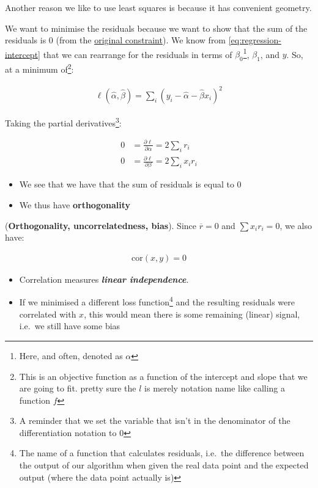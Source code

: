 \documentclass[
]{report}
\providecommand{\tightlist}{%
  \setlength{\itemsep}{0pt}\setlength{\parskip}{0pt}}
\theoremstyle{definition}
\theoremstyle{definition}
\theoremstyle{definition}
\theoremstyle{definition}
\theoremstyle{remark}
\begin{document}
Another reason we like to use least squares is because it has convenient
geometry.

We want to minimise the residuals because we want to show that the sum of the
residuals is 0 (from the \protect\hyperlink{og-constraint}{original constraint}). We know from
\eqref{eq:regression-intercept} that we can rearrange for the residuals in terms
of \(\beta_{0}\)\footnote{Here, and often, denoted as \(\alpha\)}, \(\beta_{1}\), and \(y\).
So, at a minimum of\footnote{This is an objective function as a function of the
  intercept and slope that we are going to fit. pretty sure the \(l\) is merely
  notation name like calling a function \(f\)}:

\begin{align}
  \ell (\hat{\alpha}, \hat{\beta}) = \sum_i (y_i - \hat{\alpha} - \hat{\beta}
  x_i)^2 \label{eq:min-squared-errors}
\end{align}

Taking the partial derivatives\footnote{A reminder that we set the variable that isn't
  in the denominator of the differentiation notation to 0}:

\begin{align*}
  0&= \frac{\partial \ell}{\partial \alpha} = 2 \sum_i r_i\\
  0&= \frac{\partial\ell}{\partial\beta} = 2 \sum_i x_i r_i
\end{align*}

\begin{itemize}
\tightlist
\item
  We see that we have that the sum of residuals is equal to 0
\item
  We thus have \textbf{orthogonality}
\end{itemize}

(\textbf{Orthogonality, uncorrelatedness, bias}). Since \(\overline{r} = 0\) and \(\sum x_{i}r_{i} = 0\), we also have:

\begin{align*}
  \text{cor}(x,y) = 0
\end{align*}

\begin{itemize}
\tightlist
\item
  Correlation measures \textbf{\emph{linear independence}}.
\item
  If we minimised a different loss function\footnote{The name of a function that
    calculates residuals, i.e.~the difference between the output of our algorithm
    when given the real data point and the expected output (where the data point
    actually is)} and the resulting residuals were correlated with \(x\), this
  would mean there is some remaining (linear) signal, i.e.~we still have some
  bias
\end{itemize}
\end{document}
